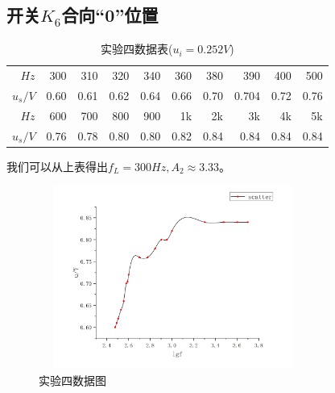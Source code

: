 \documentclass[a4 paper,12pt]{article}
\begin{document}
    \subsection{开关$K_{6}$合向“0”位置}
              \begin{table}[H]
    	\centering
    	\caption{实验四数据表($u_{i}=0.252V$)}
    	\label{实验四数据表}
    	\begin{tabular}{|r|r|r|r|r|r|r|r|r|r|}
    		\toprule[0.5mm]
    		$Hz$&300&310&320&340&360&380&390&400&500\\
    		$u_{s}/V$&0.60&0.61&0.62&0.64&0.66&0.70&0.704&0.72&0.76\\
    		\midrule
    		$Hz$&600&700&800&900&1k&2k&3k&4k&5k\\
    		$u_{s}/V$&0.76&0.78&0.80&0.80&0.82&0.84&0.84&0.84&0.84\\
    		\bottomrule[0.5mm]
    	\end{tabular}
    \end{table}
    \par 我们可以从上表得出$f_{L}=300Hz,A_{2}\approx 3.33$。
    		\begin{figure}[H]
    	\centering
    	\includegraphics[width=8.8cm,height=6cm]  {实验四.png} 
    	\caption{\label{1} 实验四数据图}
    \end{figure}
\end{document}
